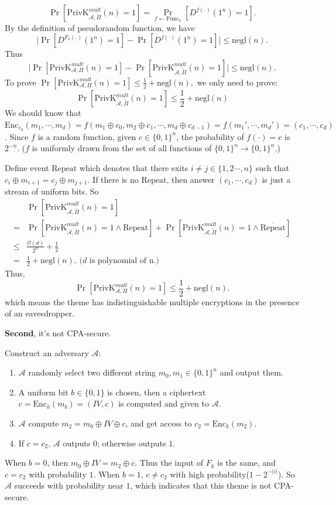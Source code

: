 \documentclass[12pt]{article}
\newcommand{\privk}{\text{PrivK}}
\newcommand{\negl}{\text{negl}}
\newcommand{\Enc}{\text{Enc}}
\newcommand{\Func}{\text{Func}}
\newcommand{\Repeat}{\text{Repeat}}
\newcommand{\A}{\mathcal{A}}
\newcommand{\OO}{\mathcal{O}}
\newenvironment{problem}[2][Problem]{\begin{trivlist}
\item[\hskip \labelsep {\bfseries #1}\hskip \labelsep {\bfseries #2.}]}{\end{trivlist}}
\begin{document}
\begin{problem}{3.11}
\[\Pr[\privk_{\A,\widetilde{\Pi}}^{mult}(n)=1]=\Pr_{f\leftarrow\Func_n}[D^{f(\cdot)}(1^n)=1].\]
By the definition of pseudorandom function, we have 
\[\mid\Pr[D^{F_k(\cdot)}(1^n)=1]-\Pr[D^{f(\cdot)}(1^n)=1]\mid\le\negl(n).\]
Thus
\[\mid\Pr[\privk_{\A,\Pi}^{mult}(n)=1]-\Pr[\privk_{\A,\widetilde{\Pi}}^{mult}(n)=1]\mid\le\negl(n).\]
To prove $\Pr[\privk_{\A,\Pi}^{mult}(n)=1]\le\frac12+\negl(n),$ we only need to prove:\[\Pr[\privk_{\A,\widetilde{\Pi}}^{mult}(n)=1]\le\frac12+\negl(n)\]
We should know that $\Enc_{c_0}(m_1,\cdots,m_d)=f(m_1\oplus c_0, m_2\oplus c_1,\cdots,m_d\oplus c_{d-1})=f(m_1',\cdots,m_d')=(c_1,\cdots,c_d)$. Since $f$ is a random function, given $c\in\{0,1\}^n$, the probability of $f(\cdot)=c$ is $2^{-n}$. ($f$ is uniformly drawn from the set of all functions of $\{0,1\}^n\rightarrow\{0,1\}^n$.)

Define event $\Repeat$ which denotes that there exits $i\ne j\in\{1,2\cdots,n\}$ such that $c_{i}\oplus m_{i+1}=c_j\oplus m_{j+1}$. If there is no $\Repeat$, then answer $(c_1,\cdots,c_d)$ is just a stream of uniform bits. So
\begin{align*}
    &\Pr[\privk_{\A,\widetilde{\Pi}}^{mult}(n)=1]\\
    =&\Pr[\privk_{\A,\widetilde{\Pi}}^{mult}(n)=1\land\Repeat]+\Pr[\privk_{\A,\widetilde{\Pi}}^{mult}(n)=1\land\overline{\Repeat}]\\
    \le&\frac{\OO(d)}{2^n}+\frac12\\
    =&\frac12+\negl(n).\text{\ \ \ \ \ ($d$ is polynomial of n.)}
\end{align*}
Thus,
\[\Pr[\privk_{\A,\Pi}^{mult}(n)=1]\le\frac12+\negl(n).\]
which means the theme has indistinguishable multiple encryptions in
the presence of an eavesdropper.\par
\par\vspace{2ex}
\textbf{Second}, it's not CPA-secure.\par
Construct an adversary $\A$: 
\begin{enumerate}
    \item $\A$ randomly select two different string $m_0,m_1\in\{0,1\}^n$ and output them.
    \item A uniform bit $b\in\{0,1\}$ is chosen, then a ciphertext $c=\Enc_k(m_b)=(IV,c)$ is computed and given to $\A$.
    \item $\A$ compute $m_2=m_0\oplus IV\oplus c$, and get access to $c_2=\Enc_k(m_2)$.
    \item If $c=c_2$, $\A$ outputs $0$; otherwise outputs $1$.
\end{enumerate}
When $b=0$, then $m_0\oplus IV=m_2\oplus c$. Thus the input of $F_k$ is the same, and $c=c_2$ with probability $1$. When $b=1$, $c\ne c_2$ with high probability($1-2^{-|c|}$). So $\A$ succeeds with probability near $1$, which indicates that this theme is not CPA-secure.\par
\end{problem}
\end{document}

